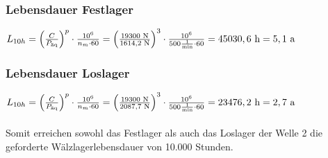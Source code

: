 \subsubsection{Lebensdauer Festlager}
$L_{10h}= \left( \frac{C}{P_{\text{äq}}} \right) ^p \cdot \frac{10^6}{n_m \cdot 60} = \left( \frac{19300 \text{ N}}{1614,2 \text{ N}} \right) ^3 \cdot \frac{10^6}{500 \frac{1}{\text{min}} \cdot 60} = 45030,6 \text{ h} = 5,1 \text{ a}$

\subsubsection{Lebensdauer Loslager}
$L_{10h}= \left( \frac{C}{P_{\text{äq}}} \right) ^p \cdot \frac{10^6}{n_m \cdot 60} = \left( \frac{19300 \text{ N}}{2087,7 \text{ N}} \right) ^3 \cdot \frac{10^6}{500 \frac{1}{\text{min}} \cdot 60} = 23476,2 \text{ h} = 2,7 \text{ a}$ \\ \\
Somit erreichen sowohl das Festlager als auch das Loslager der Welle 2 die geforderte Wälzlagerlebensdauer von 10.000 Stunden.